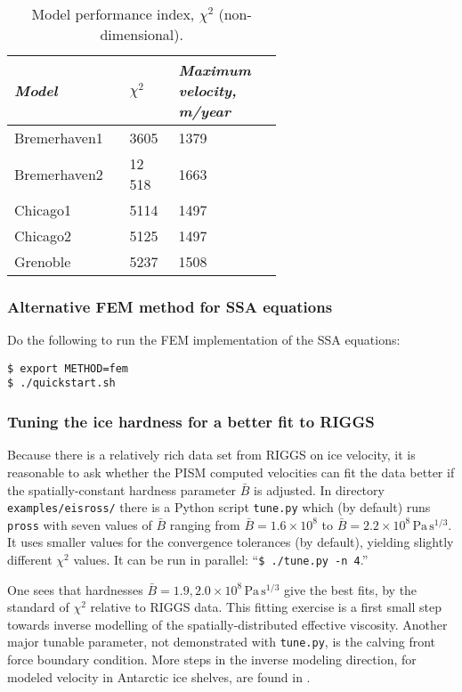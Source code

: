 \small
\begin{table}[ht]
\centering
\caption{Model performance index, $\chi^2$ (non-dimensional).  }\label{tab:chisqr}
\begin{tabular}{p{0.2\linewidth}p{0.1\linewidth}p{0.3\linewidth}}\toprule
\textsl{Model} & $\chi^2$ & \textsl{Maximum velocity, m/year} \\\midrule
Bremerhaven1 & 3605 & 1379 \\
Bremerhaven2 & 12\,518 & 1663 \\
Chicago1 & 5114 & 1497 \\
Chicago2 & 5125 & 1497 \\
Grenoble & 5237 & 1508 \\
\bottomrule
\end{tabular}
\end{table}
\normalsize

\subsubsection*{Alternative FEM method for SSA equations}  Do the following to run the FEM implementation of the SSA equations:

\begin{verbatim}
$ export METHOD=fem
$ ./quickstart.sh
\end{verbatim}


\subsubsection*{Tuning the ice hardness for a better fit to RIGGS}  Because there is a relatively rich data set from RIGGS on ice velocity, it is reasonable to ask whether the PISM computed velocities can fit the data better if the spatially-constant hardness parameter $\bar B$ is adjusted.  In directory \texttt{examples/eisross/} there is a Python script \texttt{tune.py} which (by default) runs \texttt{pross} with seven values of $\bar B$ ranging from $\bar B = 1.6  \times 10^8$ to $\bar B = 2.2 \times 10^8 \, \text{Pa}\, \text{s}^{1/3}$.  It uses smaller values for the convergence tolerances (by default), yielding slightly different $\chi^2$ values.  It can be run in parallel: ``\texttt{\$ ./tune.py -n 4}.''

One sees that hardnesses $\bar B = 1.9,2.0 \times 10^8 \, \text{Pa}\, \text{s}^{1/3}$ give the best fits, by the standard of $\chi^2$ relative to RIGGS data.  This fitting exercise is a first small step towards inverse modelling of the spatially-distributed effective viscosity.  Another major tunable parameter, not demonstrated with \texttt{tune.py}, is the calving front force boundary condition.  More steps in the inverse modeling direction, for modeled velocity in Antarctic ice shelves, are found in \cite{HumbertGreveHutter,RommelaereMacAyeal}.


